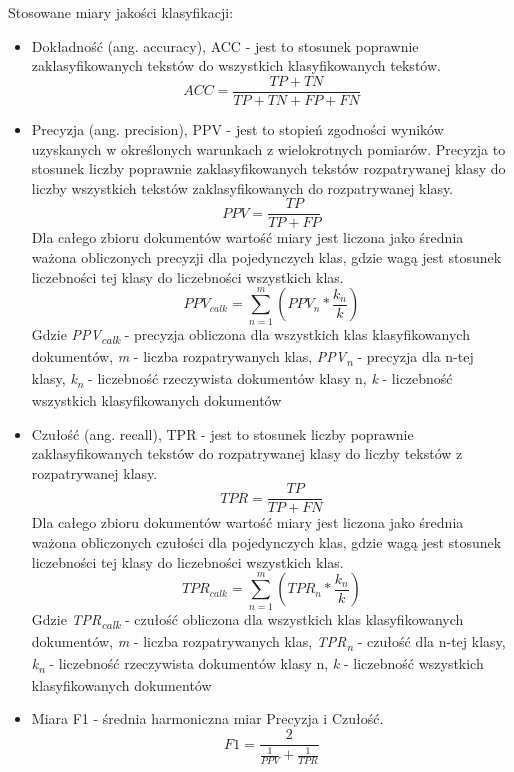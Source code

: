\documentclass{classrep}
\begin{document}
\ \\ \\ 
Stosowane miary jakości klasyfikacji:\\
\begin{itemize}
  \item Dokładność (ang. accuracy), ACC  - jest to stosunek poprawnie zaklasyfikowanych tekstów do wszystkich klasyfikowanych tekstów.
 \begin{equation}ACC = \frac{TP + TN}{TP + TN + FP + FN} \end{equation}
 \item Precyzja (ang. precision), PPV  - jest to stopień zgodności wyników uzyskanych w określonych warunkach z wielokrotnych pomiarów. Precyzja to stosunek liczby poprawnie zaklasyfikowanych tekstów rozpatrywanej klasy do liczby wszystkich tekstów zaklasyfikowanych do rozpatrywanej klasy. 
\begin{equation} PPV =  \frac{TP} {TP+FP} \end{equation} 
Dla całego zbioru dokumentów wartość miary jest liczona jako średnia ważona obliczonych precyzji dla pojedynczych klas, gdzie wagą jest stosunek liczebności tej klasy do liczebności wszystkich klas. 
\begin{equation} PPV_{calk} = \sum_{n=1}^{m} (PPV_n *\frac{k_n}{k}) \end{equation}
Gdzie \textit{PPV\textsubscript{calk}} - precyzja obliczona dla wszystkich klas klasyfikowanych dokumentów,  \textit{m} - liczba rozpatrywanych klas, \textit{PPV\textsubscript{n}} - precyzja dla n-tej klasy, \textit{k\textsubscript{n}} - liczebność rzeczywista dokumentów klasy n, \textit{k} - liczebność wszystkich klasyfikowanych dokumentów\\
\item Czułość (ang. recall), TPR  - jest to stosunek liczby poprawnie zaklasyfikowanych tekstów do rozpatrywanej klasy do liczby tekstów z rozpatrywanej klasy. 
 \begin{equation}   TPR = \frac{TP}{TP + FN} \end{equation}
Dla całego zbioru dokumentów wartość miary jest liczona jako średnia ważona obliczonych czułości dla pojedynczych klas, gdzie wagą jest stosunek liczebności tej klasy do liczebności wszystkich klas. 
\begin{equation} TPR_{calk} = \sum_{n=1}^{m} (TPR_n *\frac{k_n}{k}) \end{equation}
Gdzie \textit{TPR\textsubscript{calk}} - czułość obliczona dla wszystkich klas klasyfikowanych dokumentów,  \textit{m} - liczba rozpatrywanych klas, \textit{TPR\textsubscript{n}} - czułość dla n-tej klasy,  \textit{k\textsubscript{n}} - liczebność rzeczywista dokumentów klasy n, \textit{k} - liczebność wszystkich klasyfikowanych dokumentów\\
\item Miara F1 - średnia harmoniczna miar Precyzja i Czułość. 
\begin{equation}   F1 = \frac{2}{\frac{1}{PPV} + \frac{1}{TPR}} \end{equation}
\end{itemize}
\end{document}
